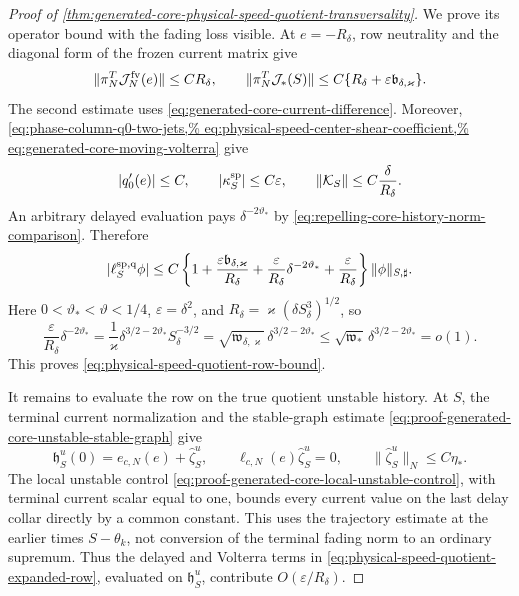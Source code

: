 \begin{proof}[Proof of
\cref{thm:generated-core-physical-speed-quotient-transversality}]
We prove its operator bound with the fading loss visible.  At
\(e=-R_\delta\), row neutrality and the diagonal form of the frozen current
matrix give
\begin{equation}
 \|\pi_N^T\mathcal J_N^{\rm fv}(e)\|\le CR_\delta,
 \qquad
 \|\pi_N^T\mathcal J_*(S)\|
 \le C\{R_\delta+\varepsilon\mathfrak b_{\delta,\varkappa}\}.
                                                        \label{eq:proof-physical-speed-current-row-bound}
\end{equation}
The second estimate uses
\cref{eq:generated-core-current-difference}.  Moreover,
\cref{eq:phase-column-q0-two-jets,%
eq:physical-speed-center-shear-coefficient,%
eq:generated-core-moving-volterra}
give
\[
 |q_0'(e)|\le C,\qquad |\kappa_S^{\rm sp}|\le C\varepsilon,
 \qquad \|\mathcal K_S\|\le C\frac{\delta}{R_\delta}.
\]
An arbitrary delayed evaluation pays
\(\delta^{-2\vartheta_*}\) by
\cref{eq:repelling-core-history-norm-comparison}.  Therefore
\begin{equation}
 |\ell_S^{\rm sp,q}\phi|
 \le C\left\{1
  +\frac{\varepsilon\mathfrak b_{\delta,\varkappa}}{R_\delta}
  +\frac{\varepsilon}{R_\delta}\delta^{-2\vartheta_*}
  +\frac{\varepsilon}{R_\delta}\right\}
       \|\phi\|_{S,\sharp}.                    \label{eq:proof-physical-speed-row-ledger}
\end{equation}
Here \(0<\vartheta_*<\vartheta<1/4\),
\(\varepsilon=\delta^2\), and
\(R_\delta=\varkappa(\delta S_\delta^3)^{1/2}\), so
\begin{equation}
 \frac{\varepsilon}{R_\delta}\delta^{-2\vartheta_*}
 =\frac1\varkappa
   \delta^{3/2-2\vartheta_*}S_\delta^{-3/2}
 =\sqrt{\mathfrak w_{\delta,\varkappa}}\,
   \delta^{3/2-2\vartheta_*}
 \le\sqrt{\mathfrak w_*}\,
   \delta^{3/2-2\vartheta_*}=o(1).
                                                       \label{eq:proof-physical-speed-fading-closes}
\end{equation}
This proves \cref{eq:physical-speed-quotient-row-bound}.

It remains to evaluate the row on the true quotient unstable history.
At \(S\), the terminal current normalization and the stable-graph estimate
\cref{eq:proof-generated-core-unstable-stable-graph} give
\begin{equation}
 \mathfrak h_S^u(0)
 =e_{c,N}(e)+\widehat\zeta_S^u,\qquad
 \ell_{c,N}(e)\widehat\zeta_S^u=0,\qquad
 \|\widehat\zeta_S^u\|_N\le C\eta_*.
                                                        \label{eq:proof-physical-speed-terminal-unstable-current}
\end{equation}
The local unstable control
\cref{eq:proof-generated-core-local-unstable-control}, with terminal
current scalar equal to one, bounds every current value on the last delay
collar directly by a common constant.  This uses the trajectory estimate
at the earlier times \(S-\theta_k\), not conversion of the terminal fading
norm to an ordinary supremum.  Thus the delayed and Volterra terms in
\cref{eq:physical-speed-quotient-expanded-row}, evaluated on
\(\mathfrak h_S^u\), contribute \(O(\varepsilon/R_\delta)\).


\end{proof}
